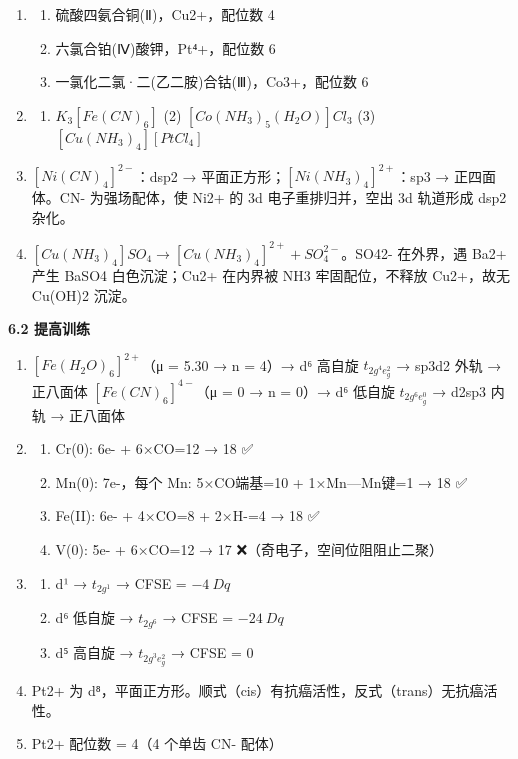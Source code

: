 \documentclass[a4paper,11pt]{ctexart}
\providecommand{\tightlist}{\setlength{\itemsep}{0pt}\setlength{\parskip}{0pt}}
\begin{document}
\begin{enumerate}
\def\labelenumi{\arabic{enumi}.}
\item
  \begin{enumerate}
  \def\labelenumii{(\arabic{enumii})}
  \tightlist
  \item
    硫酸四氨合铜(Ⅱ)，Cu2+，配位数 4
  \item
    六氯合铂(Ⅳ)酸钾，Pt⁴+，配位数 6
  \item
    一氯化二氯·二(乙二胺)合钴(Ⅲ)，Co3+，配位数 6
  \end{enumerate}
\item
  \begin{enumerate}
  \def\labelenumii{(\arabic{enumii})}
  \tightlist
  \item
    \(K_3[Fe(CN)_6]\) (2) \([Co(NH_3)_5(H_2O)]Cl_3\) (3) \([Cu(NH_3)_4][PtCl_4]\)
  \end{enumerate}
\item
  \([Ni(CN)_4]^{2-}\)：dsp2 → 平面正方形；\([Ni(NH_3)_4]^{2+}\)：sp3 → 正四面体。CN- 为强场配体，使 Ni2+ 的 3d 电子重排归并，空出 3d 轨道形成 dsp2 杂化。
\item
  \([Cu(NH_3)_4]SO_4 \rightarrow [Cu(NH_3)_4]^{2+} + SO_4^{2-}\)。SO42- 在外界，遇 Ba2+ 产生 BaSO4 白色沉淀；Cu2+ 在内界被 NH3 牢固配位，不释放 Cu2+，故无 Cu(OH)2 沉淀。
\end{enumerate}

\textbf{6.2 提高训练}

\begin{enumerate}
\def\labelenumi{\arabic{enumi}.}
\setcounter{enumi}{4}
\item
  \textbf{\([Fe(H_2O)_6]^{2+}\)}（μ = 5.30 → n = 4）→ d⁶ 高自旋 \(t_{2g^4 e_g^2}\) → sp3d2 外轨 → 正八面体
  \textbf{\([Fe(CN)_6]^{4-}\)}（μ = 0 → n = 0）→ d⁶ 低自旋 \(t_{2g^6 e_g^0}\) → d2sp3 内轨 → 正八面体
\item
  \begin{enumerate}
  \def\labelenumii{(\arabic{enumii})}
  \tightlist
  \item
    Cr(0): 6e- + 6×CO=12 → 18 ✅
  \item
    Mn(0): 7e-，每个 Mn: 5×CO端基=10 + 1×Mn---Mn键=1 → 18 ✅
  \item
    Fe(II): 6e- + 4×CO=8 + 2×H-=4 → 18 ✅
  \item
    V(0): 5e- + 6×CO=12 → 17 ❌（奇电子，空间位阻阻止二聚）
  \end{enumerate}
\item
  \begin{enumerate}
  \def\labelenumii{(\arabic{enumii})}
  \tightlist
  \item
    d¹ → \(t_{2g^1}\) → CFSE = \(-4\ Dq\)
  \item
    d⁶ 低自旋 → \(t_{2g^6}\) → CFSE = \(-24\ Dq\)
  \item
    d⁵ 高自旋 → \(t_{2g^3 e_g^2}\) → CFSE = 0
  \end{enumerate}
\item
  Pt2+ 为 d⁸，平面正方形。顺式（cis）有抗癌活性，反式（trans）无抗癌活性。
\item
  Pt2+ 配位数 = 4（4 个单齿 CN- 配体）
\end{enumerate}
\end{document}
